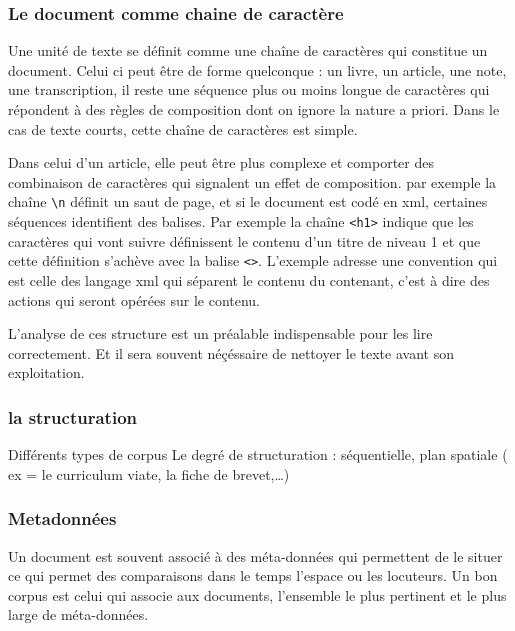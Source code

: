 \documentclass[
  letterpaper,
  DIV=11,
  numbers=noendperiod]{scrreprt}
\begin{document}
\subsubsection{Le document comme chaine de
caractère}\label{le-document-comme-chaine-de-caractuxe8re}

Une unité de texte se définit comme une chaîne de caractères qui
constitue un document. Celui ci peut être de forme quelconque : un
livre, un article, une note, une transcription, il reste une séquence
plus ou moins longue de caractères qui répondent à des règles de
composition dont on ignore la nature a priori. Dans le cas de texte
courts, cette chaîne de caractères est simple.

Dans celui d'un article, elle peut être plus complexe et comporter des
combinaison de caractères qui signalent un effet de composition. par
exemple la chaîne \texttt{\textbackslash{}n} définit un saut de page, et
si le document est codé en xml, certaines séquences identifient des
balises. Par exemple la chaîne \texttt{\textless{}h1\textgreater{}}
indique que les caractères qui vont suivre définissent le contenu d'un
titre de niveau 1 et que cette définition s'achève avec la balise
\texttt{\textless{}\textbar{}\textgreater{}}. L'exemple adresse une
convention qui est celle des langage xml qui séparent le contenu du
contenant, c'est à dire des actions qui seront opérées sur le contenu.

L'analyse de ces structure est un préalable indispensable pour les lire
correctement. Et il sera souvent néçéssaire de nettoyer le texte avant
son exploitation.

\subsubsection{la structuration}\label{la-structuration}

Différents types de corpus Le degré de structuration : séquentielle,
plan spatiale ( ex = le curriculum viate, la fiche de brevet,\ldots)

\subsubsection{Metadonnées}\label{metadonnuxe9es}

Un document est souvent associé à des méta-données qui permettent de le
situer ce qui permet des comparaisons dans le temps l'espace ou les
locuteurs. Un bon corpus est celui qui associe aux documents, l'ensemble
le plus pertinent et le plus large de méta-données.
\end{document}
